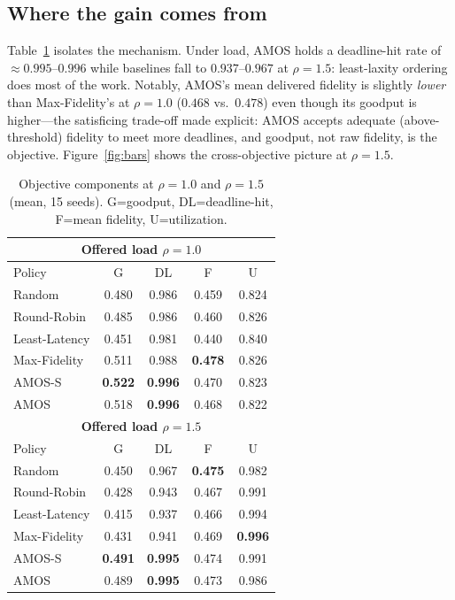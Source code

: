 \documentclass[conference]{IEEEtran}
\begin{document}
\subsection{Where the gain comes from}
Table~\ref{tab:metrics} isolates the mechanism. Under load, AMOS holds a
deadline-hit rate of $\approx\!0.995$--$0.996$ while baselines fall to
$0.937$--$0.967$ at $\rho{=}1.5$: least-laxity ordering does most of the work.
Notably, AMOS's mean delivered fidelity is slightly \emph{lower} than
Max-Fidelity's at $\rho{=}1.0$ ($0.468$ vs.\ $0.478$) even though its goodput is
higher---the satisficing trade-off made explicit: AMOS accepts adequate
(above-threshold) fidelity to meet more deadlines, and goodput, not raw fidelity,
is the objective. Figure~\ref{fig:bars} shows the cross-objective picture at
$\rho{=}1.5$.

\begin{table}[t]
\caption{Objective components at $\rho{=}1.0$ and $\rho{=}1.5$ (mean, 15 seeds).
G=goodput, DL=deadline-hit, F=mean fidelity, U=utilization.}
\label{tab:metrics}
\centering
\small
\begin{tabular}{@{}l cccc@{}}
\toprule
\multicolumn{5}{c}{\textbf{Offered load $\rho=1.0$}}\\
\midrule
Policy & G & DL & F & U\\
\midrule
Random        & 0.480 & 0.986 & 0.459 & 0.824\\
Round-Robin   & 0.485 & 0.986 & 0.460 & 0.826\\
Least-Latency & 0.451 & 0.981 & 0.440 & 0.840\\
Max-Fidelity  & 0.511 & 0.988 & \textbf{0.478} & 0.826\\
AMOS-S        & \textbf{0.522} & \textbf{0.996} & 0.470 & 0.823\\
AMOS          & 0.518 & \textbf{0.996} & 0.468 & 0.822\\
\midrule
\multicolumn{5}{c}{\textbf{Offered load $\rho=1.5$}}\\
\midrule
Policy & G & DL & F & U\\
\midrule
Random        & 0.450 & 0.967 & \textbf{0.475} & 0.982\\
Round-Robin   & 0.428 & 0.943 & 0.467 & 0.991\\
Least-Latency & 0.415 & 0.937 & 0.466 & 0.994\\
Max-Fidelity  & 0.431 & 0.941 & 0.469 & \textbf{0.996}\\
AMOS-S        & \textbf{0.491} & \textbf{0.995} & 0.474 & 0.991\\
AMOS          & 0.489 & \textbf{0.995} & 0.473 & 0.986\\
\bottomrule
\end{tabular}
\end{table}
\end{document}
